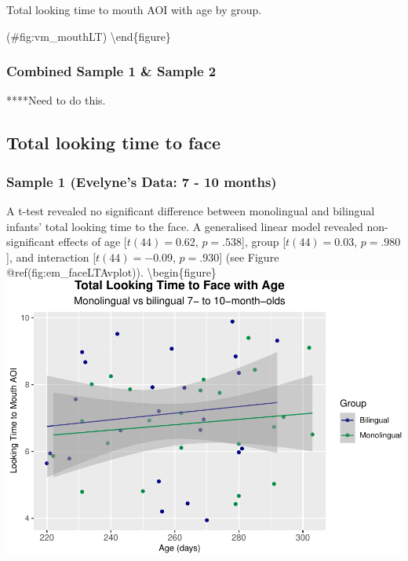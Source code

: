 \documentclass[english,man,floatsintext]{apa6}
\begin{document}
\caption{Total looking time to mouth AOI with age by group.}

(\#fig:vm\_mouthLT)
\textbackslash{}end\{figure\}

\hypertarget{combined-sample-1-sample-2-1}{%
\subsubsection{Combined Sample 1 \& Sample 2}\label{combined-sample-1-sample-2-1}}

****Need to do this.

\hypertarget{total-looking-time-to-face}{%
\subsection{Total looking time to face}\label{total-looking-time-to-face}}

\hypertarget{sample-1-evelynes-data-7---10-months-2}{%
\subsubsection{Sample 1 (Evelyne's Data: 7 - 10 months)}\label{sample-1-evelynes-data-7---10-months-2}}

A t-test revealed no significant difference between monolingual and bilingual infants' total looking time to the face. A generalised linear model revealed non-significant effects of age {[}\(t(44) = 0.62\), \(p = .538\){]}, group {[}\(t(44) = 0.03\), \(p = .980\){]}, and interaction {[}\(t(44) = -0.09\), \(p = .930\){]} (see Figure @ref(fig:em\_faceLTAvplot)).
\textbackslash{}begin\{figure\}
\includegraphics{Effects_of_early_language_experience_on_infants_files/figure-latex/em_faceLTAvplot-1}
\end{document}
